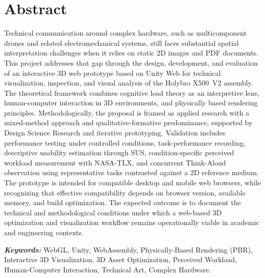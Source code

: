 \documentclass[12pt,letterpaper]{article} %
\begin{document}
\section*{Abstract}
{}
\setlength{\parindent}{0pt} %
Technical communication around complex hardware, such as multicomponent drones and related electromechanical systems, still faces substantial spatial interpretation challenges when it relies on static 2D images and PDF documents. This project addresses that gap through the design, development, and evaluation of an interactive 3D web prototype based on Unity Web for technical visualization, inspection, and visual analysis of the Holybro X500~V2 assembly. The theoretical framework combines cognitive load theory as an interpretive lens, human-computer interaction in 3D environments, and physically based rendering principles. Methodologically, the proposal is framed as applied research with a mixed-method approach and qualitative-formative predominance, supported by Design Science Research and iterative prototyping. Validation includes performance testing under controlled conditions, task-performance recording, descriptive usability estimation through SUS, condition-specific perceived workload measurement with NASA-TLX, and concurrent Think-Aloud observation using representative tasks contrasted against a 2D reference medium. The prototype is intended for compatible desktop and mobile web browsers, while recognizing that effective compatibility depends on browser version, available memory, and build optimization. The expected outcome is to document the technical and methodological conditions under which a web-based 3D optimization and visualization workflow remains operationally viable in academic and engineering contexts.

\hspace{1.27cm}\textit{\textbf{Keywords:}} WebGL, Unity, WebAssembly, Physically-Based Rendering (PBR), Interactive 3D Visualization, 3D Asset Optimization, Perceived Workload, Human-Computer Interaction, Technical Art, Complex Hardware.

\newpage

\setlength{\parindent}{1.27cm}

\newpage
\tableofcontents
\newpage

\newpage
\renewcommand{\listtablename}{Lista de Tablas}
\listoftables
\newpage
\end{document}
